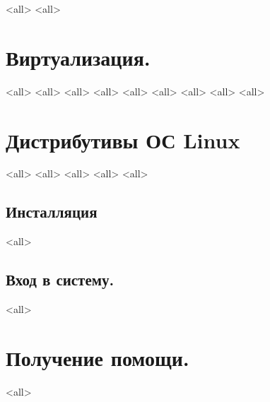 \mode<all>{}
\mode<all>{}
\section{Виртуализация.}
\mode<all>{}
\mode<all>{}
\mode<all>{}
\mode<all>{}
\mode<all>{}
\mode<all>{}
\mode<all>{}
\mode<all>{}
\mode<all>{}

\section{Дистрибутивы ОС Linux}
\mode<all>{}
\mode<all>{}
\mode<all>{}
\mode<all>{}
\mode<all>{}
\subsection{Инсталляция}
\mode<all>{}

\subsection{Вход в систему.}
\mode<all>{}

\section{Получение помощи.}
\mode<all>{}

\bye
